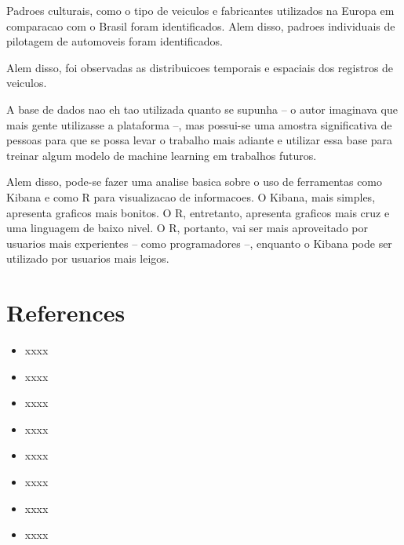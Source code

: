 \documentclass[10pt, conference]{IEEEtran}
\begin{document}
Padroes culturais,
como o tipo de veiculos e fabricantes utilizados na Europa em comparacao com o Brasil foram identificados. 
Alem disso, padroes individuais de pilotagem de automoveis foram identificados. 

Alem disso, foi observadas as distribuicoes temporais e espaciais dos registros de veiculos.

A base de dados nao eh tao utilizada quanto se supunha -- o autor imaginava que mais gente utilizasse a
plataforma --, mas possui-se uma amostra significativa de pessoas para que se possa levar o trabalho
mais adiante e utilizar essa base para treinar algum modelo de machine learning em trabalhos futuros.

Alem disso, pode-se fazer uma analise basica sobre o uso de ferramentas como Kibana e como R para
visualizacao de informacoes. O Kibana, mais simples, apresenta graficos mais bonitos. O R, entretanto,
apresenta graficos mais cruz e uma linguagem de baixo nivel. O R, portanto, vai ser mais aproveitado
por usuarios mais experientes -- como programadores --, enquanto o Kibana pode ser utilizado por usuarios
mais leigos.



\iffinal
\section*{References}
%

\begin{itemize}
  \item xxxx
  \item xxxx
  \item xxxx
  \item xxxx
  \item xxxx
  \item xxxx
  \item xxxx
  \item xxxx
\end{itemize}

\fi







\end{document}
